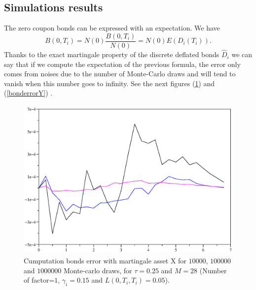 \subsection{Simulations results}
The zero coupon bonds can be expressed with an expectation. We have
$$B(0,T_i)=N(0)\frac{B(0,T_i)}{N(0)}=N(0)E(D_i(T_i)).$$
Thanks to the exact martingale property of the discrete deflated
bonds $\hat{D}_i$ we can say that if we compute the expectation of the
previous formula, the error only comes from noises due to the number of
Monte-Carlo draws and will tend to vanish when this number goes to
infinity. See the next figures (\ref{bonderrorX}) and  (\ref{bonderrorY}) .
\begin{figure}[H]
\begin{center}
\includegraphics[height=8cm]{./figures/bondserror.eps}
\caption{Cumputation bonds error with martingale asset X for $10 000$, $100 000$ and $1 000 000$ Monte-carlo
  draws, for $\tau=0.25$ and $M=28$ (Number of factor=$1$, $\gamma_i=0.15$ and $L(0,T_i,T_i)=0.05$).}
\label{bonderrorX}
\end{center}
\end{figure}

